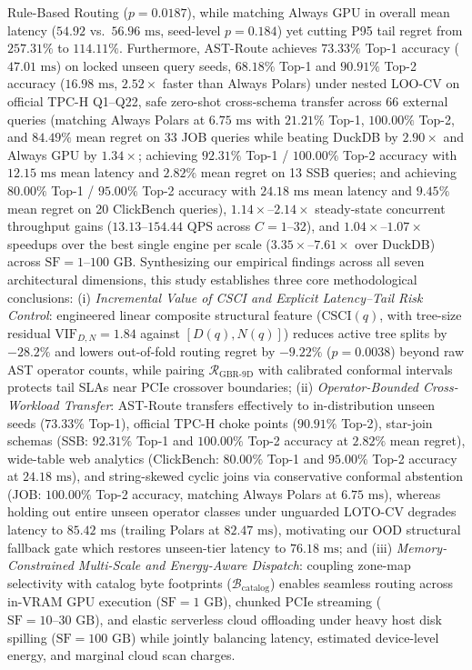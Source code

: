 \documentclass[10pt,a4paper]{article}
\begin{document}
Rule-Based Routing ($p=0.0187$), while matching Always GPU in overall mean latency ($54.92$ vs.\ $56.96\text{ ms}$, seed-level $p=0.184$) yet cutting P95 tail regret from $257.31\%$ to $114.11\%$. Furthermore, AST-Route achieves $73.33\%$ Top-1 accuracy ($47.01\text{ ms}$) on locked unseen query seeds, $68.18\%$ Top-1 and $90.91\%$ Top-2 accuracy ($16.98\text{ ms}$, $2.52\times$ faster than Always Polars) under nested LOO-CV on official TPC-H Q1--Q22, safe zero-shot cross-schema transfer across 66 external queries (matching Always Polars at $6.75\text{ ms}$ with $21.21\%$ Top-1, $100.00\%$ Top-2, and $84.49\%$ mean regret on 33 JOB queries while beating DuckDB by $2.90\times$ and Always GPU by $1.34\times$; achieving $92.31\%$ Top-1 / $100.00\%$ Top-2 accuracy with $12.15\text{ ms}$ mean latency and $2.82\%$ mean regret on 13 SSB queries; and achieving $80.00\%$ Top-1 / $95.00\%$ Top-2 accuracy with $24.18\text{ ms}$ mean latency and $9.45\%$ mean regret on 20 ClickBench queries), $1.14\times\text{--}2.14\times$ steady-state concurrent throughput gains ($13.13\text{--}154.44\text{ QPS}$ across $C=1\text{--}32$), and $1.04\times\text{--}1.07\times$ speedups over the best single engine per scale ($3.35\times\text{--}7.61\times$ over DuckDB) across $\text{SF}=1\text{--}100\text{ GB}$. Synthesizing our empirical findings across all seven architectural dimensions, this study establishes three core methodological conclusions: (i) \textit{Incremental Value of CSCI and Explicit Latency--Tail Risk Control}: engineered linear composite structural feature ($\text{CSCI}(q)$, with tree-size residual $\text{VIF}_{D,N}=1.84$ against $[D(q), N(q)]$) reduces active tree splits by $-28.2\%$ and lowers out-of-fold routing regret by $-9.22\%$ ($p=0.0038$) beyond raw AST operator counts, while pairing $\mathcal{R}_{\text{GBR-9D}}$ with calibrated conformal intervals protects tail SLAs near PCIe crossover boundaries; (ii) \textit{Operator-Bounded Cross-Workload Transfer}: AST-Route transfers effectively to in-distribution unseen seeds ($73.33\%$ Top-1), official TPC-H choke points ($90.91\%$ Top-2), star-join schemas (SSB: $92.31\%$ Top-1 and $100.00\%$ Top-2 accuracy at $2.82\%$ mean regret), wide-table web analytics (ClickBench: $80.00\%$ Top-1 and $95.00\%$ Top-2 accuracy at $24.18\text{ ms}$), and string-skewed cyclic joins via conservative conformal abstention (JOB: $100.00\%$ Top-2 accuracy, matching Always Polars at $6.75\text{ ms}$), whereas holding out entire unseen operator classes under unguarded LOTO-CV degrades latency to $85.42\text{ ms}$ (trailing Polars at $82.47\text{ ms}$), motivating our OOD structural fallback gate which restores unseen-tier latency to $76.18\text{ ms}$; and (iii) \textit{Memory-Constrained Multi-Scale and Energy-Aware Dispatch}: coupling zone-map selectivity with catalog byte footprints ($\mathcal{B}_{\text{catalog}}$) enables seamless routing across in-VRAM GPU execution ($\text{SF}=1\text{ GB}$), chunked PCIe streaming ($\text{SF}=10\text{--}30\text{ GB}$), and elastic serverless cloud offloading under heavy host disk spilling ($\text{SF}=100\text{ GB}$) while jointly balancing latency, estimated device-level energy, and marginal cloud scan charges.
\end{document}
